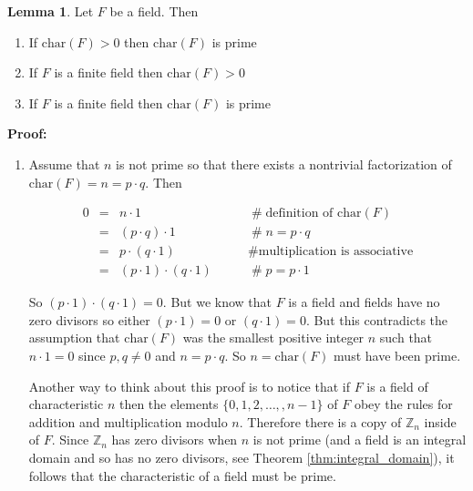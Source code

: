 \documentclass[11pt, oneside]{article}   	%
\theoremstyle{definition}
\newtheorem{lemma}{Lemma}[section]
\begin{document}
\begin{lemma}
Let $F$ be a field. Then
\begin{enumerate}
\item If $\text{char}(F) > 0$  then $\text{char} (F)$ is prime
\label{char:1}
\item If $F$ is a finite field then $\text{char} (F)  >  0$
\label{char:2}
\item If $F$ is a finite field then $\text{char} (F)$ is prime
\end{enumerate}
\end{lemma}

\bigskip
\noindent
\textbf{Proof:} 

\begin{enumerate}
\item Assume that $n$ is not prime so that there exists a nontrivial factorization of $\text{char}(F) = n = p \cdot  q$. Then

\begin{equation*}
\begin{array}{rcll}
0
&=&  n \cdot 1                                                           &\qquad \mathrel{\#} \text{definition of $\text{char}(F)$} \\
&=&  (p \cdot q) \cdot 1                                             &\qquad \mathrel{\#} n = p \cdot q \\
&=&  p \cdot (q \cdot 1)                                             &\qquad \mathrel{\#} \text{multiplication is associative} \\
&=& (p \cdot 1) \cdot (q \cdot 1)                                &\qquad \mathrel{\#} p = p \cdot 1
\end{array}
\end{equation*}

So $(p \cdot 1) \cdot (q \cdot 1) = 0$. But we know that $F$ is a field and fields have no zero divisors so either $(p \cdot 1) = 0$ or 
$(q \cdot 1) = 0$. But this contradicts the assumption that  $\text{char}(F)$ was the smallest positive integer $n$ such that $n \cdot 1 = 0$ 
since $p, q \neq 0$ and $n = p \cdot q$. So $n = \text{char}(F)$ must have been prime.
\label{enumerate:1}

Another way to think about this proof is to notice that if $F$ is a field of characteristic $n$ then the elements $\{0,1,2,\hdots,,n-1\}$ of $F$ 
obey the rules for addition and  multiplication modulo $n$. Therefore there is a copy of $\mathbb{Z}_n$ inside of $F$. Since $\mathbb{Z}_n$ 
has zero divisors when $n$ is not prime (and a field is an integral domain and so has no zero divisors, see Theorem \ref{thm:integral_domain}), 
it follows that the characteristic of a field must be prime. 


\end{enumerate}
\end{document}
